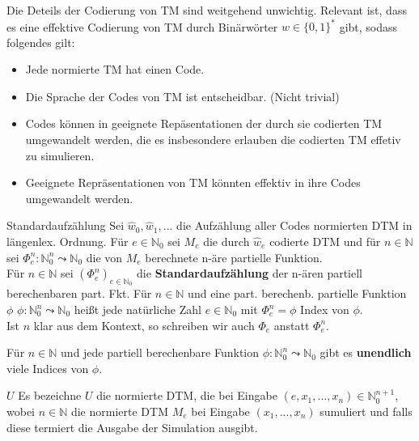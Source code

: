 Die Deteils der Codierung von TM sind weitgehend unwichtig. Relevant ist, dass es eine effektive Codierung 
von TM durch Binärwörter $w \in \{0,1\}^*$ gibt, sodass folgendes gilt:
\begin{itemize}
    \item Jede normierte TM hat einen Code.
    \item Die Sprache der Codes von TM ist entscheidbar. (Nicht trivial)
    \item Codes können in geeignete Repäsentationen der durch sie codierten TM umgewandelt werden, die es 
          insbesondere erlauben die codierten TM effetiv zu simulieren.
    \item Geeignete Repräsentationen von TM könnten effektiv in ihre Codes umgewandelt werden.
\end{itemize}

\begin{defn}{Standardaufzählung}
    Sei $\hat{w}_0, \hat{w}_1,...$ die Aufzählung aller Codes normierten DTM in längenlex. Ordnung. Für $e \in \mathbb{N}_0$ sei $M_e$
    die durch $\hat{w}_e$ codierte DTM und für $n \in \mathbb{N}$ sei $\Phi_e^n : \mathbb{N}_0^n \leadsto \mathbb{N}_0$ die von $M_e$ 
    berechnete n-äre partielle Funktion.\\
    
    Für $n \in \mathbb{N}$ sei $(\Phi_e^n)_{e \in \mathbb{N}_0}$ die \textbf{Standardaufzählung} der n-ären partiell berechenbaren part. Fkt. 
    Für $n \in \mathbb{N}$ und eine part. berechenb. partielle Funktion $\phi$
    $\phi : \mathbb{N}_0^n \leadsto \mathbb{N}_0$ heißt jede natürliche Zahl $e \in \mathbb{N}_0$ mit $\Phi_e^n = \phi$ Index von $\phi$. \\
    Ist $n$ klar aus dem Kontext, so schreiben wir auch $\Phi_e$ anstatt $\Phi_e^n$. \\
\end{defn}

\begin{bem}
    Für $n \in \mathbb{N}$ und jede partiell berechenbare Funktion $\phi : \mathbb{N}_0^n \leadsto \mathbb{N}_0$ gibt es \textbf{unendlich} viele Indices von $\phi$.
\end{bem}

\begin{defn}{$U$}
    Es bezeichne $U$ die normierte DTM, die bei Eingabe $(e,x_1,...,x_n) \in \mathbb{N}_0^{n+1}$, wobei $n \in \mathbb{N}$ 
    die normierte DTM $M_e$ bei Eingabe $(x_1,...,x_n)$ sumuliert und falls diese termiert die Ausgabe der Simulation ausgibt.
\end{defn}

